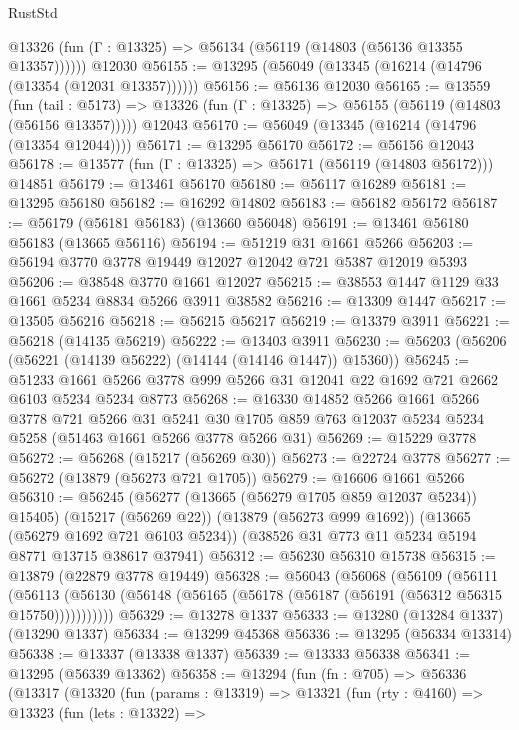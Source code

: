 \begin{lexlean}{RustStd}
\begin{coremodule}
      @13326 (fun (Γ : @13325) => @56134 (@56119 (@14803 (@56136 @13355 @13357))))))
    @12030
@56155 := @13295 (@56049 (@13345 (@16214 (@14796 (@13354 (@12031 @13357))))))
@56156 := @56136 @12030
@56165 := @13559
    (fun (tail : @5173) => @13326 (fun (Γ : @13325) => @56155 (@56119 (@14803 (@56156 @13357)))))
    @12043
@56170 := @56049 (@13345 (@16214 (@14796 (@13354 @12044))))
@56171 := @13295 @56170
@56172 := @56156 @12043
@56178 := @13577 (fun (Γ : @13325) => @56171 (@56119 (@14803 @56172))) @14851
@56179 := @13461 @56170
@56180 := @56117 @16289
@56181 := @13295 @56180
@56182 := @16292 @14802
@56183 := @56182 @56172
@56187 := @56179 (@56181 @56183) (@13660 @56048)
@56191 := @13461 @56180 @56183 (@13665 @56116)
@56194 := @51219 @31 @1661 @5266
@56203 := @56194 @3770 @3778 @19449 @12027 @12042 @721 @5387 @12019 @5393
@56206 := @38548 @3770 @1661 @12027
@56215 := @38553 @1447 @1129 @33 @1661 @5234 @8834 @5266 @3911 @38582
@56216 := @13309 @1447
@56217 := @13505 @56216
@56218 := @56215 @56217
@56219 := @13379 @3911
@56221 := @56218 (@14135 @56219)
@56222 := @13403 @3911
@56230 := @56203 (@56206 (@56221 (@14139 @56222) (@14144 (@14146 @1447)) @15360))
@56245 := @51233
    @1661
    @5266
    @3778
    @999
    @5266
    @31
    @12041
    @22
    @1692
    @721
    @2662
    @6103
    @5234
    @5234
    @8773
@56268 := @16330
    @14852
    @5266
    @1661
    @5266
    @3778
    @721
    @5266
    @31
    @5241
    @30
    @1705
    @859
    @763
    @12037
    @5234
    @5234
    @5258
    (@51463 @1661 @5266 @3778 @5266 @31)
@56269 := @15229 @3778
@56272 := @56268 (@15217 (@56269 @30))
@56273 := @22724 @3778
@56277 := @56272 (@13879 (@56273 @721 @1705))
@56279 := @16606 @1661 @5266
@56310 := @56245
    (@56277 (@13665 (@56279 @1705 @859 @12037 @5234)) @15405)
    (@15217 (@56269 @22))
    (@13879 (@56273 @999 @1692))
    (@13665 (@56279 @1692 @721 @6103 @5234))
    (@38526 @31 @773 @11 @5234 @5194 @8771 @13715 @38617 @37941)
@56312 := @56230 @56310 @15738
@56315 := @13879 (@22879 @3778 @19449)
@56328 := @56043
    (@56068
      (@56109
        (@56111
          (@56113 (@56130 (@56148 (@56165 (@56178 (@56187 (@56191 (@56312 @56315 @15750)))))))))))
@56329 := @13278 @1337
@56333 := @13280 (@13284 @1337) (@13290 @1337)
@56334 := @13299 @45368
@56336 := @13295 (@56334 @13314)
@56338 := @13337 (@13338 @1337)
@56339 := @13333 @56338
@56341 := @13295 (@56339 @13362)
@56358 := @13294
    (fun (fn : @705) =>
    @56336
      (@13317
        (@13320
          (fun (params : @13319) =>
          @13321
            (fun (rty : @4160) =>
            @13323
              (fun (lets : @13322) =>

\end{coremodule}
\end{lexlean}
